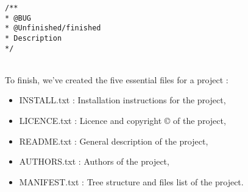 \begin{lstlisting}[frame=trBL, title=Programming convention for bugs]
/**
* @BUG
* @Unfinished/finished
* Description
*/
\end{lstlisting}
~\\
To finish, we've created the five essential files for a project : \\
\begin{itemize}
\item INSTALL.txt  : Installation instructions for the project,
\item LICENCE.txt  : Licence and copyright \copyright{} of the project,
\item README.txt   : General description of the project,
\item AUTHORS.txt  : Authors of the project,
\item MANIFEST.txt : Tree structure and files list of the project.
\end{itemize}

